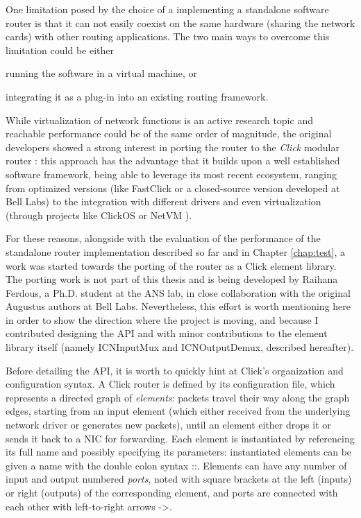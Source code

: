 \documentclass[11pt,a4paper,twoside,titlepage,openany]{book}
\newcommand{\mono}[1]{{\footnotesize \ttfamily #1}}
\begin{document}
One limitation posed by the choice of a implementing a standalone software router is that it can not easily coexist on the same hardware (sharing the network cards) with other routing applications. The two main ways to overcome this limitation could be either \begin{inlineenum} \item running the software in a virtual machine, or \item integrating it as a plug-in into an existing routing framework. \end{inlineenum}
While virtualization of network functions is an active research topic and reachable performance could be of the same order of magnitude, the original developers showed a strong interest in porting the router to the \emph{Click} modular router \cite{click}: this approach has the advantage that it builds upon a well established software framework, being able to leverage its most recent ecosystem, ranging from optimized versions (like FastClick \cite{fastclick} or a closed-source version developed at Bell Labs) to the integration with different drivers and even virtualization (through projects like ClickOS \cite{clickos} or NetVM \cite{netvm}).

For these reasons, alongside with the evaluation of the performance of the standalone router implementation described so far and in Chapter \ref{chap:test}, a work was started towards the porting of the router as a Click element library. The porting work is not part of this thesis and is being developed by Raihana Ferdous, a Ph.D. student at the ANS lab, in close collaboration with the original Augustus authors at Bell Labs.
Nevertheless, this effort is worth mentioning here in order to show the direction where the project is moving, and because I contributed designing the API and with minor contributions to the element library itself (namely \mono{ICNInputMux} and \mono{ICNOutputDemux}, described hereafter).

Before detailing the API, it is worth to quickly hint at Click's organization and configuration syntax. A Click router is defined by its configuration file, which represents a directed graph of \emph{elements}: packets travel their way along the graph edges, starting from an input element (which either received from the underlying network driver or generates new packets), until an element either drops it or sends it back to a NIC for forwarding. Each element is instantiated by referencing its full name and possibly specifying its parameters: instantiated elements can be given a name with the double colon syntax \mono{::}. Elements can have any number of input and output numbered \emph{ports}, noted with square brackets at the left (inputs) or right (outputs) of the corresponding element, and ports are connected with each other with left-to-right arrows \mono{->}.
\end{document}
